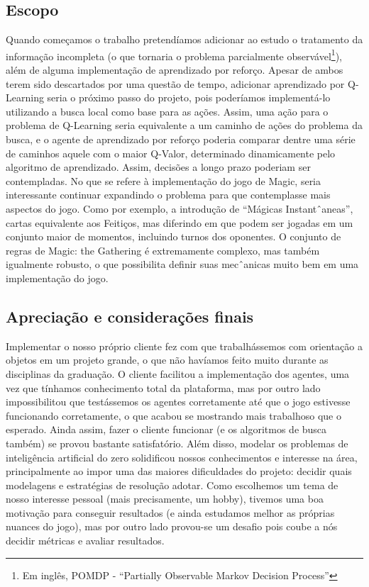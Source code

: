 \subsection{Escopo}
Quando começamos o trabalho pretendíamos adicionar ao estudo o tratamento da informação incompleta
(o que tornaria o problema parcialmente observável\footnote{Em inglês, POMDP - ``Partially Observable Markov Decision Process''}), além de alguma implementação de aprendizado por reforço. Apesar de ambos terem sido descartados por uma questão de tempo, adicionar aprendizado por Q-Learning seria o próximo passo do projeto, pois poderíamos implementá-lo utilizando a busca local como base para as ações. Assim, uma ação para o problema de Q-Learning seria equivalente a um caminho de ações do problema da busca, e o agente de aprendizado por reforço poderia comparar dentre uma série de caminhos aquele com o maior Q-Valor, determinado dinamicamente pelo algoritmo de aprendizado. Assim, decisões a longo prazo poderiam ser contempladas. No que se refere à implementação do jogo de Magic, seria interessante continuar expandindo o problema para que contemplasse mais aspectos do jogo. Como por exemplo, a introdução de ``Mágicas Instantˆaneas'', cartas equivalente aos Feitiços, mas diferindo em que podem ser jogadas em um conjunto maior de momentos, incluindo turnos dos oponentes. O conjunto de regras de Magic: the Gathering é extremamente complexo, mas também igualmente robusto, o que possibilita definir suas mecˆanicas muito bem em uma implementação do jogo.

\subsection{Apreciação e considerações finais}
Implementar o nosso próprio cliente fez com que trabalhássemos com orientação a objetos em um projeto grande, o que não havíamos feito muito durante as disciplinas da graduação. O cliente facilitou a implementação dos agentes, uma vez que tínhamos conhecimento total da plataforma, mas por outro lado impossibilitou que testássemos os agentes corretamente até que o jogo estivesse funcionando corretamente, o que acabou se mostrando mais trabalhoso que o esperado. Ainda assim, fazer o cliente funcionar (e os algoritmos de busca também) se provou bastante satisfatório. Além disso, modelar os problemas de inteligência artificial do zero solidificou nossos conhecimentos e interesse na área, principalmente ao impor uma das maiores dificuldades do projeto: decidir quais modelagens e estratégias de resolução adotar. Como escolhemos um tema de nosso interesse pessoal (mais precisamente, um hobby), tivemos uma boa motivação para conseguir resultados (e ainda estudamos melhor as próprias nuances do jogo), mas por outro lado provou-se um desafio pois coube a nós decidir métricas e avaliar resultados.

